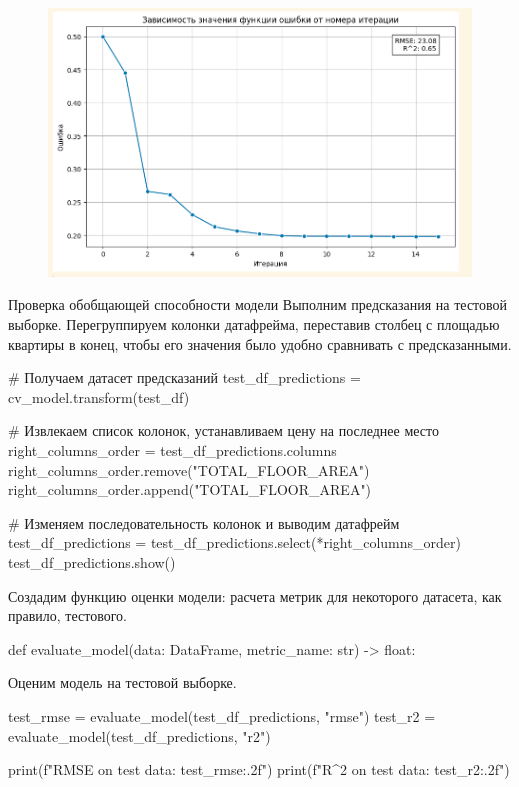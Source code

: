 \begin{figure}
    \centering
    \includegraphics[width=\textwidth]{Content/Images/Zavisimost.png}
    \label{fig:ZZFOONI}
\end{figure}

\par Проверка обобщающей способности модели
Выполним предсказания на тестовой выборке. 
Перегруппируем колонки датафрейма, переставив столбец с площадью квартиры в конец, чтобы его значения было удобно сравнивать с предсказанными.
\begin{code}
# Получаем датасет предсказаний
test_df_predictions = cv_model.transform(test_df)

# Извлекаем список колонок, устанавливаем цену на последнее место
right_columns_order = test_df_predictions.columns
right_columns_order.remove("TOTAL_FLOOR_AREA")
right_columns_order.append("TOTAL_FLOOR_AREA")

# Изменяем последовательность колонок и выводим датафрейм
test_df_predictions = test_df_predictions.select(*right_columns_order)
test_df_predictions.show()
\end{code}

Создадим функцию оценки модели: расчета метрик для некоторого датасета, как правило, тестового.
\begin{code}
def evaluate_model(data: DataFrame, metric_name: str) -> float:
\end{code}

Оценим модель на тестовой выборке.
\begin{code}
test_rmse = evaluate_model(test_df_predictions, "rmse")
test_r2 = evaluate_model(test_df_predictions, "r2")

print(f"RMSE on test data: {test_rmse:.2f}")
print(f"R^2 on test data: {test_r2:.2f}")
\end{code}

